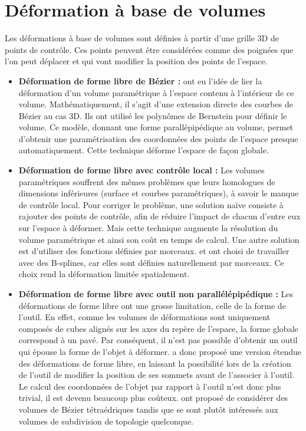 \section{Déformation à base de volumes}

Les déformations à base de volumes sont définies à partir d'une grille 3D de
points de contrôle. Ces points peuvent être considérées comme des poignées que
l'on peut déplacer et qui vont modifier la position des points de l'espace.

\begin{itemize}

\item{\textbf{Déformation de forme libre de Bézier :}} \cite{SP86} ont eu
l'idée de lier la déformation d'un volume paramétrique à l'espace contenu à
l'intérieur de ce volume. Mathématiquement, il s'agit d'une extension directe
des courbes de Bézier au cas 3D. Ils ont utilisé les polynômes de Bernstein
pour définir le volume. Ce modèle, donnant une forme parallépipédique au
volume, permet d'obtenir une paramétrisation des coordonnées des points de
l'espace presque automatiquement. Cette technique déforme l'espace de façon
globale.

\item{\textbf{Déformation de forme libre avec contrôle local :}} Les volumes
paramétriques souffrent des mêmes problèmes que leurs homologues de dimensions
inférieures (surface et courbes paramétriques), à savoir le manque de contrôle
local. Pour corriger le problème, une solution naïve consiste à rajouter des
points de contrôle, afin de réduire l'impact de chacun d'entre eux sur
l'espace à déformer. Mais cette technique augmente la résolution du volume
paramétrique et ainsi son coût en temps de calcul. Une autre solution est
d'utiliser des fonctions définies par morceaux. \cite{GP89} et \cite{Com89}
ont choisi de travailler avec des B-splines, car elles sont définies
naturellement par morceaux. Ce choix rend la déformation limitée spatialement.

\item{\textbf{Déformation de forme libre avec outil non  parallélépipédique
:}} Les déformations de forme libre ont une grosse limitation, celle de la
forme de l'outil. En effet, comme les volumes de déformations sont uniquement
composés de cubes alignés sur les axes du repère de l'espace, la forme globale
correspond à un pavé. Par conséquent, il n'est pas possible d'obtenir un outil
qui épouse la forme de l'objet à déformer. \cite{Coq90} a donc proposé une
version étendue des déformations de forme libre, en laissant la possibilité
lors de la création de l'outil de modifier la position de ses sommets avant de
l'associer à l'outil. Le calcul des coordonnées de l'objet par rapport à
l'outil n'est donc plus trivial, il est devenu beaucoup plus coûteux.
\cite{BBT97} ont proposé de considérer des volumes de Bézier tétraédriques
tandis que \cite{MJ96} se sont plutôt intéressés aux volumes de subdivision de
topologie quelconque.

\end{itemize}

